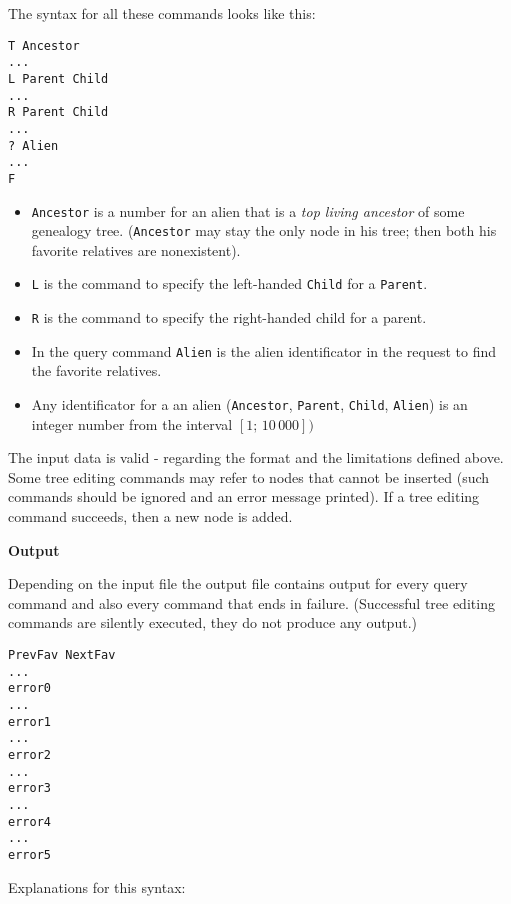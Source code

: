 \documentclass[11pt]{article}
\begin{document}
The syntax for all these commands looks like this:

\begin{verbatim}
T Ancestor
...
L Parent Child
...
R Parent Child
...
? Alien
...
F
\end{verbatim}

\begin{itemize}
\item {\tt Ancestor} is a number for an alien that is a {\em top living ancestor} of some genealogy tree. 
({\tt Ancestor} may stay the only node in his tree; then both his favorite relatives are nonexistent). 
\item {\tt L} is the command to specify the left-handed {\tt Child} for a {\tt Parent}. 
\item {\tt R} is the command to specify the right-handed child for a parent.
\item In the query command {\tt Alien} is the alien identificator in the request to find the favorite relatives. 
\item Any identificator for a an alien ({\tt Ancestor}, {\tt Parent}, {\tt Child}, {\tt Alien}) 
is an integer number from the interval $[1;\,10\,000])$
\end{itemize}

The input data is valid - regarding the format and the limitations defined above. 
Some tree editing commands may refer to nodes that cannot be inserted (such commands should be ignored and 
an error message printed). If a tree editing command succeeds, then a new node is added.

\vspace{20pt}
{\bf Output}

Depending on the input file the output file contains output for every query command 
and also every command that ends in failure. 
(Successful tree editing commands are silently executed, they do not produce any output.) 

\begin{verbatim}
PrevFav NextFav
...
error0
...
error1
...
error2
...
error3
...
error4
...
error5
\end{verbatim}

Explanations for this syntax:
\end{document}
